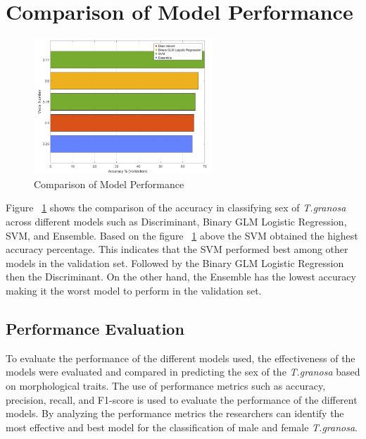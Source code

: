 \section{Comparison of Model Performance}
\begin{figure}[!htbp]
	\centering
	\includegraphics[width=0.6\textwidth]{figures/compare-models.png}
	\caption{Comparison of Model Performance}
	\label{fig:compare-models}
\end{figure}

Figure ~\ref{fig:compare-models} shows the comparison of the accuracy in classifying sex of \textit{T.granosa} across different models such as Discriminant, Binary GLM Logistic Regression, SVM, and Ensemble. Based on the figure ~\ref{fig:compare-models} above the SVM obtained the highest accuracy percentage. This indicates that the SVM performed best among other models in the validation set. Followed by the Binary GLM Logistic Regression then the Discriminant. On the other hand, the Ensemble has the lowest accuracy making it the worst model to perform in the validation set. 

\subsection{Performance Evaluation}

To evaluate the performance of the different models used, the effectiveness of the models were evaluated and compared in predicting the sex of the \textit{T.granosa} based on morphological traits. The use of performance metrics such as accuracy, precision, recall, and F1-score is used to evaluate the performance of the different models. By analyzing the performance metrics the researchers can identify the most effective and best model for the classification of male and female \textit{T.granosa}. 


